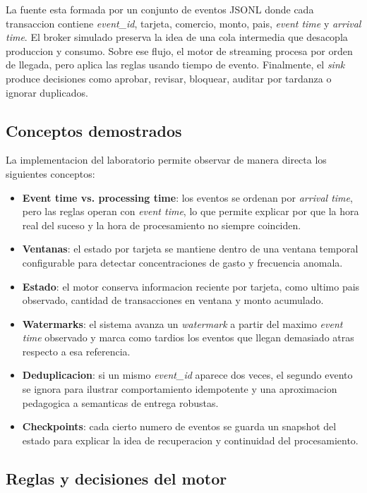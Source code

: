 \documentclass[12pt,a4paper]{article}
\begin{document}
La fuente esta formada por un conjunto de eventos JSONL donde cada transaccion contiene \textit{event\_id}, tarjeta, comercio, monto, pais, \textit{event time} y \textit{arrival time}. El broker simulado preserva la idea de una cola intermedia que desacopla produccion y consumo. Sobre ese flujo, el motor de streaming procesa por orden de llegada, pero aplica las reglas usando tiempo de evento. Finalmente, el \textit{sink} produce decisiones como aprobar, revisar, bloquear, auditar por tardanza o ignorar duplicados.

\subsection{Conceptos demostrados}

La implementacion del laboratorio permite observar de manera directa los siguientes conceptos:

\begin{itemize}
  \item \textbf{Event time vs. processing time}: los eventos se ordenan por \textit{arrival time}, pero las reglas operan con \textit{event time}, lo que permite explicar por que la hora real del suceso y la hora de procesamiento no siempre coinciden.
  \item \textbf{Ventanas}: el estado por tarjeta se mantiene dentro de una ventana temporal configurable para detectar concentraciones de gasto y frecuencia anomala.
  \item \textbf{Estado}: el motor conserva informacion reciente por tarjeta, como ultimo pais observado, cantidad de transacciones en ventana y monto acumulado.
  \item \textbf{Watermarks}: el sistema avanza un \textit{watermark} a partir del maximo \textit{event time} observado y marca como tardios los eventos que llegan demasiado atras respecto a esa referencia.
  \item \textbf{Deduplicacion}: si un mismo \textit{event\_id} aparece dos veces, el segundo evento se ignora para ilustrar comportamiento idempotente y una aproximacion pedagogica a semanticas de entrega robustas.
  \item \textbf{Checkpoints}: cada cierto numero de eventos se guarda un snapshot del estado para explicar la idea de recuperacion y continuidad del procesamiento.
\end{itemize}

\subsection{Reglas y decisiones del motor}
\end{document}
